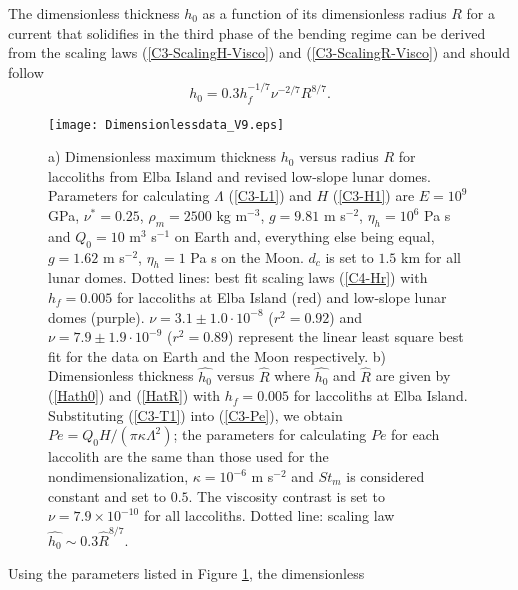 The dimensionless thickness  $h_0$ as a function  of its dimensionless
radius $R$  for a current  that solidifies in  the third phase  of the
bending   regime    can   be    derived   from   the    scaling   laws
(\ref{C3-ScalingH-Visco})  and  (\ref{C3-ScalingR-Visco})  and  should
follow
\begin{equation}
  h_0 = 0.3 h_f^{-1/7}\nu^{-2/7}R^{8/7}\label{C4-Hr}.
\end{equation}
\begin{figure}[h!]
  \begin{center}
    \graphicspath{ {/Users/thorey/Documents/These/Projet/Refroidissement/Skin_Model/Figure/Figure_Heating/} }
    \texttt{[image: Dimensionlessdata\_V9.eps]}
    \caption{a)  Dimensionless maximum  thickness $h_0$  versus radius
      $R$ for laccoliths from Elba  Island and revised low-slope lunar
      domes.  Parameters  for calculating $\Lambda$  (\ref{C3-L1}) and
      $H$    (\ref{C3-H1})    are    $E=10^9$    GPa,    $\nu^*=0.25$,
      $\rho_m = 2500$ kg m$^{-3}$, $g=9.81$ m s$^{-2}$, $\eta_h =10^6$
      Pa s and $Q_0 = 10$ m$^3$ s$^{-1}$ on Earth and, everything else
      being  equal, $g=1.62$  m  s$^{-2}$,  $\eta_h =1$  Pa  s on  the
      Moon. $d_c$  is set  to $1.5$  km for  all lunar  domes.  Dotted
      lines: best  fit scaling laws  (\ref{C4-Hr}) with $h_f  = 0.005$
      for laccoliths  at Elba Island  (red) and low-slope  lunar domes
      (purple).   $\nu =  3.1\pm 1.0  \cdot 10^{-8}$  ($r^2=0.92$) and
      $\nu  = 7.9\pm  1.9  \cdot 10^{-9}$  ($r^2=0.89$) represent  the
      linear least square best fit for  the data on Earth and the Moon
      respectively.   b)  Dimensionless thickness  $\hat{h_0}$  versus
      $\hat{R}$  where   $\hat{h_0}$  and   $\hat{R}$  are   given  by
      (\ref{Hath0}) and  (\ref{HatR}) with $h_f=0.005$  for laccoliths
      at Elba Island.   Substituting (\ref{C3-T1}) into (\ref{C3-Pe}),
      we obtain $Pe  = Q_0 H /(\pi \kappa  \Lambda^2)$; the parameters
      for calculating $Pe$ for each  laccolith are the same than those
      used for the  nondimensionalization, $\kappa=10^{-6}$ m s$^{-2}$
      and  $St_m$  is  considered  constant and  set  to  $0.5$.   The
      viscosity contrast is  set to $\nu =7.9\times  10^{-10}$ for all
      laccoliths.         Dotted        line:       scaling        law
      $ \hat{h_0} \sim 0.3\hat{R}^{8/7}$.}
    \label{C4-Data}
  \end{center}
\end{figure}
Using the parameters listed in Figure \ref{C4-Data}, the dimensionless
